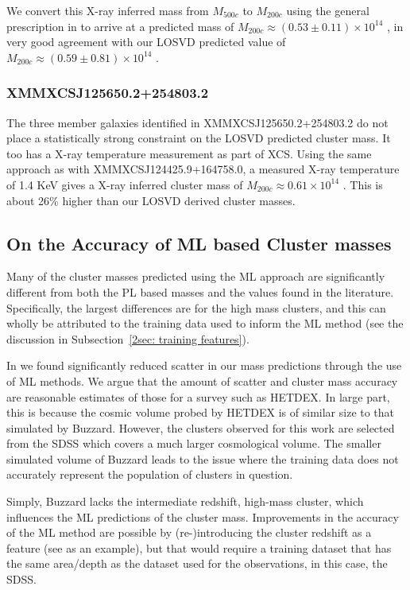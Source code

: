 We convert this X-ray inferred mass from $M_{500c}$ to $M_{200c}$ using the general prescription in \cite{Hu2003} to arrive at a predicted mass of $M_{200c} \approx (0.53\pm0.11)\times10^{14}$ \Msol, in very good agreement with our LOSVD predicted value of $M_{200c} \approx (0.59\pm0.81)\times10^{14}$ \Msol.

\subsubsection{XMMXCSJ125650.2+254803.2}
The three member galaxies identified in XMMXCSJ125650.2+254803.2 do not place a statistically strong constraint on the LOSVD predicted cluster mass. It too has a X-ray temperature measurement as part of XCS. Using the same approach as with XMMXCSJ124425.9+164758.0, a measured X-ray temperature of 1.4 KeV gives a X-ray inferred cluster mass of $M_{200c} \approx 0.61\times10^{14}$ \Msol. This is about 26\% higher than our LOSVD derived cluster masses. 

\subsection{On the Accuracy of ML based Cluster masses}
Many of the cluster masses predicted using the ML approach are significantly different from both the PL based masses and the values found in the literature. Specifically, the largest differences are for the high mass clusters, and this can wholly be attributed to the training data used to inform the ML method (see the discussion in Subsection~\ref{2sec: training features}). 

In  we found significantly reduced scatter in our mass predictions through the use of ML methods. We argue that the amount of scatter and cluster mass accuracy are reasonable estimates of those for a survey such as HETDEX. In large part, this is because the cosmic volume probed by HETDEX is of similar size to that simulated by Buzzard. However, the clusters observed for this work are selected from the SDSS which covers a much larger cosmological volume. The smaller simulated volume of Buzzard leads to the issue where the training data does not accurately represent the population of clusters in question.

Simply, Buzzard lacks the intermediate redshift, high-mass cluster, which influences the ML predictions of the cluster mass. Improvements in the accuracy of the ML method are possible by (re-)introducing the cluster redshift as a feature (see  as an example), but that would require a training dataset that has the same area/depth as the dataset used for the observations, in this case, the SDSS.

